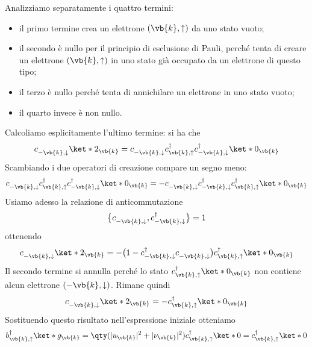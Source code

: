Analizziamo separatamente i quattro termini:
\begin{itemize}[leftmargin=0.5cm]
   \item il primo termine crea un elettrone $(\vb{k},\uparrow)$ da uno stato vuoto;
   \item il secondo è nullo per il principio di esclusione di Pauli, perché tenta di creare un elettrone $(\vb{k},\uparrow)$ in uno stato già occupato da un elettrone di questo tipo;
   \item il terzo è nullo perché tenta di annichilare un elettrone in uno stato vuoto;
   \item il quarto invece è non nullo.
\end{itemize}
Calcoliamo esplicitamente l'ultimo termine: si ha che
\begin{equation*}
   c^{\vphantom{\dag}}_{-\vb{k},\downarrow} \ket*{2_{\vb{k}}}
   =c^{\vphantom{\dag}}_{-\vb{k},\downarrow} c^{\dag}_{\vb{k},\uparrow} c^{\dag}_{-\vb{k},\downarrow} \ket*{0_{\vb{k}}}
\end{equation*}
Scambiando i due operatori di creazione compare un segno meno:
\begin{equation*}
   c^{\vphantom{\dag}}_{-\vb{k},\downarrow} c^{\dag}_{\vb{k},\uparrow} c^{\dag}_{-\vb{k},\downarrow} \ket*{0_{\vb{k}}}
   = - c^{\vphantom{\dag}}_{-\vb{k},\downarrow} c^{\dag}_{-\vb{k},\downarrow} c^{\dag}_{\vb{k},\uparrow} \ket*{0_{\vb{k}}}
\end{equation*}
Usiamo adesso la relazione di anticommutazione
\begin{equation*}
   \bigl\{ c^{\vphantom{\dag}}_{-\vb{k},\downarrow} , c^{\dag}_{-\vb{k},\downarrow} \bigr\}=1
\end{equation*}
ottenendo
\begin{equation*}
   c^{\vphantom{\dag}}_{-\vb{k},\downarrow} \ket*{2_{\vb{k}}}
   =
   -\bigl( 1- c^{\dag}_{-\vb{k},\downarrow} c^{\vphantom{\dag}}_{-\vb{k},\downarrow} \bigr) c^{\dag}_{\vb{k},\uparrow}
   \ket*{0_{\vb{k}}}
\end{equation*}
Il secondo termine si annulla perché lo stato $c^{\dag}_{\vb{k},\uparrow}\ket*{0_{\vb{k}}}$ non contiene alcun elettrone $(-\vb{k},\downarrow)$. Rimane quindi
\begin{equation*}
   c^{\vphantom{\dag}}_{-\vb{k},\downarrow}
   \ket*{2_{\vb{k}}} = -c^{\dag}_{\vb{k},\uparrow}\ket*{0_{\vb{k}}}
\end{equation*}
Sostituendo questo risultato nell'espressione iniziale otteniamo
\begin{equation*}
   b^{\dag}_{\vb{k},\uparrow}
   \ket*{g_{\vb{k}}}
   =
   \qty(
      |u_{\vb{k}}|^2+|\nu_{\vb{k}}|^2
   )
   c^{\dag}_{\vb{k},\uparrow}
   \ket*{0}
   =
   c^{\dag}_{\vb{k},\uparrow}
   \ket*{0}
\end{equation*}
